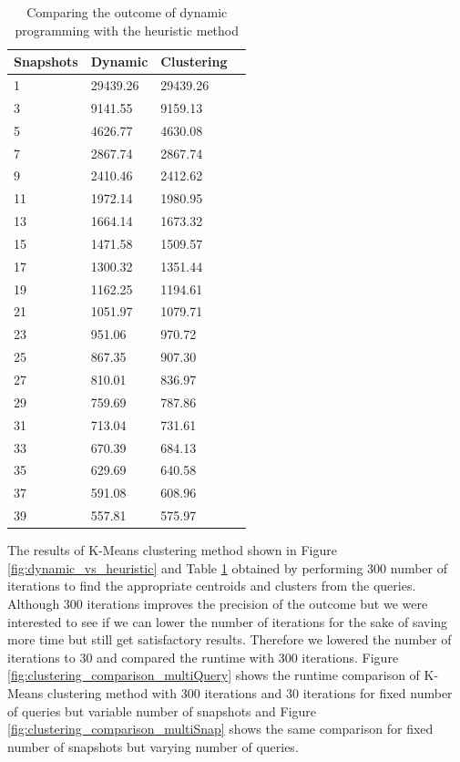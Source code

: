 			\begin {center}
			\begin{table}
				\centering
				\caption{Comparing the outcome of dynamic programming with the heuristic method}
				\label {table:dynamic_vs_heuristic}
				\begin{tabular}{p{2cm}p{3cm}p{3cm}p{3cm}}
					\hline
					Snapshots & Dynamic  & Clustering \\ \hline
					1 & 29439.26  & 29439.26  \\  
					3 & 9141.55  & 9159.13  \\
					5 & 4626.77  & 4630.08  \\
					7 & 2867.74  & 2867.74  \\
					9 & 2410.46  & 2412.62 \\
					11 & 1972.14  & 1980.95  \\
					13 & 1664.14  & 1673.32  \\
					15 & 1471.58  & 1509.57  \\
					17 & 1300.32  & 1351.44  \\
					19 & 1162.25  & 1194.61  \\
					21 & 1051.97  & 1079.71  \\
					23 & 951.06  & 970.72  \\
					25 & 867.35  & 907.30  \\
					27 & 810.01  & 836.97  \\
					29 & 759.69  & 787.86  \\
					31 & 713.04  & 731.61  \\
					33 & 670.39  & 684.13  \\
					35 & 629.69  & 640.58  \\
					37 & 591.08  & 608.96  \\
					39 & 557.81  & 575.97  \\\hline
				\end{tabular}
			\end{table}
			\end{center}

			The results of K-Means clustering method shown in Figure \ref{fig:dynamic_vs_heuristic} and Table \ref{table:dynamic_vs_heuristic} obtained by performing 300 number of iterations to find the appropriate centroids and clusters from the queries. Although 300 iterations improves the precision of the outcome but we were interested to see if we can lower the number of iterations for the sake of saving more time but still get satisfactory results. Therefore we lowered the number of iterations to 30 and compared the runtime with 300 iterations. Figure \ref{fig:clustering_comparison_multiQuery} shows the runtime comparison of K-Means clustering method with 300 iterations and 30 iterations for fixed number of queries but variable number of snapshots and Figure \ref{fig:clustering_comparison_multiSnap} shows the same comparison for fixed number of snapshots but varying number of queries.

